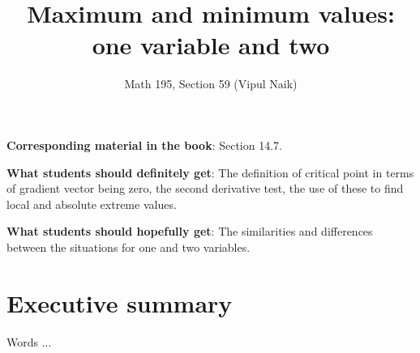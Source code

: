 \documentclass[10pt]{amsart}
\title{Maximum and minimum values: one variable and two}
\author{Math 195, Section 59 (Vipul Naik)}
\begin{document}
\maketitle

{\bf Corresponding material in the book}: Section 14.7.

{\bf What students should definitely get}: The definition of critical
point in terms of gradient vector being zero, the second derivative
test, the use of these to find local and absolute extreme values.

{\bf What students should hopefully get}: The similarities and
differences between the situations for one and two variables.
\section*{Executive summary}

Words ...
\end{document}
